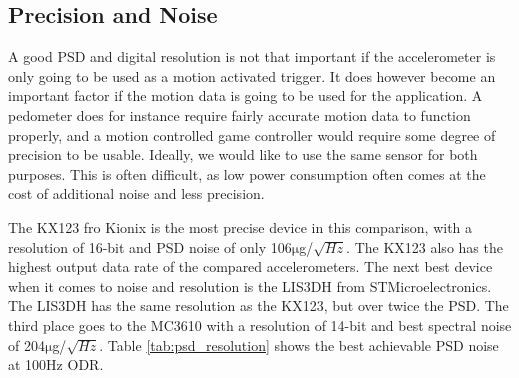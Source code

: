 
\subsection{Precision and Noise}

A good PSD and digital resolution is not that important if the accelerometer is only going to be used as a motion activated trigger. It does however become an important factor if the motion data is going to be used for the application. A pedometer does for instance require fairly accurate motion data to function properly, and a motion controlled game controller would require some degree of precision to be usable. Ideally, we would like to use the same sensor for both purposes. This is often difficult, as low power consumption often comes at the cost of additional noise and less precision.

The KX123 fro Kionix is the most precise device in this comparison, with a resolution of 16-bit and PSD noise of only 106$\si{\micro}$g/$\sqrt{Hz}$. The KX123 also has the highest output data rate of the compared accelerometers. The next best device when it comes to noise and resolution is the LIS3DH from STMicroelectronics. The LIS3DH has the same resolution as the KX123, but over twice the PSD. The third place goes to the MC3610 with a resolution of 14-bit and best spectral noise of 204$\si{\micro}$g/$\sqrt{Hz}$. Table \ref{tab:psd_resolution} shows the best achievable PSD noise at 100Hz ODR.  

